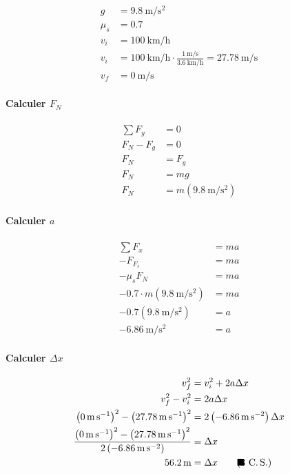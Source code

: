 \documentclass[letterpaper]{article}
\newcommand{\qed}{\rlap{$\qquad \blacksquare$}}
\begin{document}
        
        \begin{align*}
            g &= \qty{9.8}{\metre\per\second\squared} \\
            \mu_s &= \num{0.7} \\
            v_i &= \qty{100}{\kilo\metre\per\hour} \\
            v_i &= \qty{100}{\kilo\metre\per\hour} \cdot \frac{\qty{1}{\metre\per\second}}{\qty{3.6}{\kilo\metre\per\hour}} = \qty{27.78}{\metre\per\second} \\
            v_f &= \qty{0}{\metre\per\second}
        \end{align*}
        
        \paragraph*{Calculer $F_N$}
        \begin{align*}
            \sum F_y &= 0 \\
            F_N - F_g &= 0 \\
            F_N &= F_g \\
            F_N &= mg \\
            F_N &= m \left(\qty{9.8}{\metre\per\second\squared}\right)
        \end{align*}
        
        \paragraph*{Calculer $a$}
        \begin{align*}
            \sum F_x &= ma \\
            - F_{F_s} &= ma \\
            - \mu_sF_N &= ma \\
            - \num{0.7} \cdot m \left(\qty{9.8}{\metre\per\second\squared}\right) &= ma \\
            - \num{0.7} \left(\qty{9.8}{\metre\per\second\squared}\right) &= a \tag{Simplification de $m$ des deux c\^ot\'es} \\
            \qty{-6.86}{\metre\per\second\squared} &= a
        \end{align*}
        
        \paragraph*{Calculer $\Delta x$}
        \begin{align*}
            v_f^2 &= v_i^2 + 2a\Delta x \\
            v_f^2 - v_i^2 &= 2a\Delta x \\
            \left(\qty{0}{\metre\per\second}\right)^2 - \left(\qty{27.78}{\metre\per\second}\right)^2 &= 2\left(\qty{-6.86}{\metre\per\second\squared}\right)\Delta x \\
            \frac{\left(\qty{0}{\metre\per\second}\right)^2 - \left(\qty{27.78}{\metre\per\second}\right)^2}{2\left(\qty{-6.86}{\metre\per\second\squared}\right)} &= \Delta x \\
            \qty{56.2}{\metre} &= \Delta x \qed \tag{3 C.\,S.}\\
        \end{align*}
\end{document}

